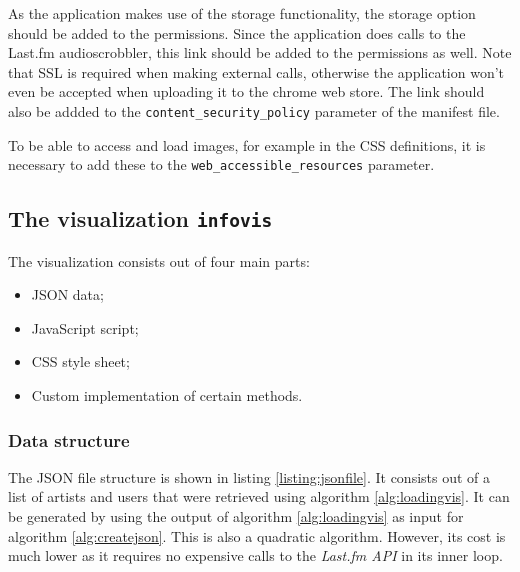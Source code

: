As the application makes use of the storage functionality, the storage option should be added to the permissions. Since the application does calls to the Last.fm audioscrobbler, this link should be added to the permissions as well. Note that SSL is required when making external calls, otherwise the application won't even be accepted when uploading it to the chrome web store. The link should also be addded to the \texttt{content\_security\_policy} parameter of the manifest file.

To be able to access and load images, for example in the CSS definitions, it is necessary to add these to the \texttt{web\_accessible\_resources} parameter.

\subsection{The visualization \texttt{infovis}}\label{chapter:implementation:section:implementation:subsection:whitebox}

The visualization consists out of four main parts:

\begin{itemize}
	\item JSON data;
	\item JavaScript script;
	\item CSS style sheet;
	\item Custom implementation of certain methods.
\end{itemize}

\subsubsection{Data structure}

The JSON file structure is shown in listing \ref{listing:jsonfile}. It consists out of a list of artists and users that were retrieved using algorithm \ref{alg:loadingvis}. It can be generated by using the output of algorithm \ref{alg:loadingvis} as input for algorithm \ref{alg:createjson}. This is also a quadratic algorithm. However, its cost is much lower as it requires no expensive calls to the \emph{Last.fm API} in its inner loop.



%

